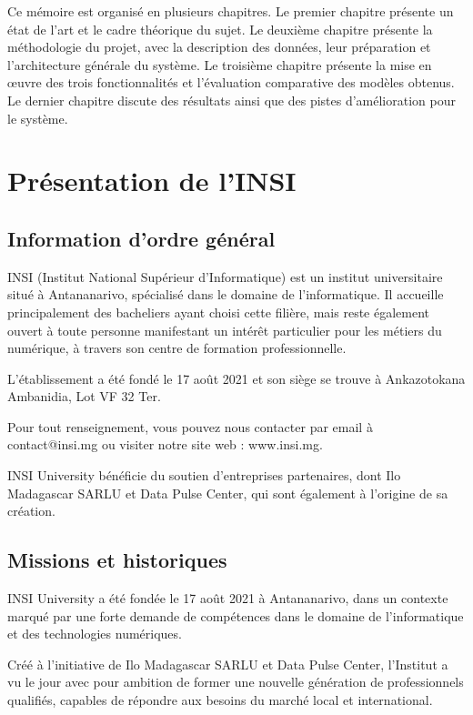 \documentclass[a4paper,12pt, oneside]{article}
\begin{document}
Ce mémoire est organisé en plusieurs chapitres. Le premier chapitre présente un état de l'art et le cadre théorique du sujet. Le deuxième chapitre présente la méthodologie du projet, avec la description des données, leur préparation et l'architecture générale du système. Le troisième chapitre présente la mise en œuvre des trois fonctionnalités et l'évaluation comparative des modèles obtenus. Le dernier chapitre discute des résultats ainsi que des pistes d'amélioration pour le système.
\vspace*{\fill}
\newpage

\section{Présentation de l'INSI}
\subsection{Information d'ordre général}

INSI (Institut National Supérieur d'Informatique) est un institut universitaire situé à Antananarivo, spécialisé dans le domaine de l'informatique. Il accueille principalement des bacheliers ayant choisi cette filière, mais reste également ouvert à toute personne manifestant un intérêt particulier pour les métiers du numérique, à travers son centre de formation professionnelle.

L'établissement a été fondé le 17 août 2021 et son siège se trouve à Ankazotokana Ambanidia, Lot VF 32 Ter.

Pour tout renseignement, vous pouvez nous contacter par email à contact@insi.mg ou visiter notre site web : www.insi.mg.

INSI University bénéficie du soutien d'entreprises partenaires, dont Ilo Madagascar SARLU et Data Pulse Center, qui sont également à l'origine de sa création.
\subsection{Missions et historiques}

INSI University a été fondée le 17 août 2021 à Antananarivo, dans un contexte marqué par une forte demande de compétences dans le domaine de l'informatique et des technologies numériques.

Créé à l'initiative de Ilo Madagascar SARLU et Data Pulse Center, l'Institut a vu le jour avec pour ambition de former une nouvelle génération de professionnels qualifiés, capables de répondre aux besoins du marché local et international.
\end{document}

